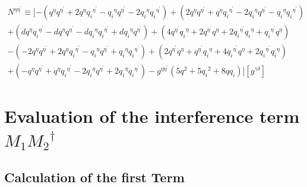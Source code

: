 \begin{equation}
\begin{split}
N^{{\eta}{{\eta}^{\prime}}}\equiv [-({q}^{{\eta}}{q}^{{\eta}^{\prime}}+2{q}^{{\eta}}{q_i}^{{\eta}^{\prime}}-{q_i}^{{\eta}}{q}^{{\eta}^{\prime}}-2{q_i}^{{\eta}}{q_i}^{{\eta}^{\prime}})
+(2{q}^{{\eta}}{q}^{{\eta}^{\prime}}+{q}^{{\eta}}{q_i}^{{\eta}^{\prime}}-2{q_i}^{{\eta}}{q}^{{\eta}^{\prime}}-{q_i}^{{\eta}}{q_i}^{{\eta}^{\prime}})\\+(d{q}^{{\eta}}{q_i}^{{\eta}^{\prime}}-d{q}^{{\eta}}{q}^{{\eta}^{\prime}}-d{q_i}^{{\eta}}{q_i}^{{\eta}^{\prime}}+d{q_i}^{{\eta}}{q}^{{\eta}^{\prime}})+(4{q}^{{\eta}^{\prime}}{q_i}^{{\eta}}+2{q}^{{\eta}^{\prime}}{q}^{{\eta}}+2{q_i}^{{\eta}^{\prime}}{q_i}^{{\eta}}+{q_i}^{{\eta}^{\prime}}{q}^{{\eta}})\\
-(-2{q}^{{\eta}}{q}^{{\eta}^{\prime}}+2{q}^{{\eta}}{q_i}^{{\eta}^{\prime}}-{q_i}^{{\eta}}{q}^{{\eta}^{\prime}}+{q_i}^{{\eta}}{q_i}^{{\eta}^{\prime}})+(2{q}^{{\eta}^{\prime}}{q}^{{\eta}}+{q}^{{\eta}^{\prime}}{q_i}^{{\eta}}+4{q_i}^{{\eta}^{\prime}}{q}^{{\eta}}+2{q_i}^{{\eta}^{\prime}}{q_i}^{{\eta}})\\+(-{q}^{{\eta}}{q}^{{\eta}^{\prime}}+{q}^{{\eta}}{q_i}^{{\eta}^{\prime}}-2{q_i}^{{\eta}}{q}^{{\eta}^{\prime}}+2{q_i}^{{\eta}}{q_i}^{{\eta}^{\prime}})
-g^{{\eta}{{\eta}^{\prime}}}(5{q}^2+5{q_i}^2+8qq_i)][g^{{\gamma}{\delta}}]
\end{split}
\end{equation}

\hfill

\section*{Evaluation of the interference term $M_1 {M_2}^{\dagger}$}
\label{EvaIntGG}

\subsection*{Calculation of the first Term}

